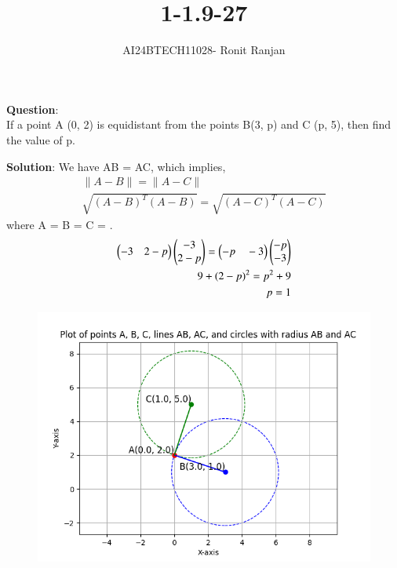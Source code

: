 \documentclass[journal]{IEEEtran}
\begin{document}

\vspace{3cm}

\title{1-1.9-27}
\author{AI24BTECH11028- Ronit Ranjan}

{\let\newpage\relax\maketitle}

\renewcommand{\thefigure}{\theenumi}
\renewcommand{\thetable}{\theenumi}
\setlength{\intextsep}{10pt} %


\renewcommand{\thetable}{\theenumi}

\textbf{Question}:\\
If a point A (0, 2) is equidistant from the points B(3, p) and C (p, 5), then find the value of p.


\textbf{Solution}:
We have AB = AC, which implies,
\begin{align}
    \|A-B\| = \|A-C\| \\
    \sqrt{(A-B)^{T}(A-B)} = \sqrt{(A-C)^{T}(A-C)}
\end{align}
where A = 
B = 
C = .
\begin{align}
    \begin{pmatrix}
    -3\quad 2-p
    \end{pmatrix}
    \begin{pmatrix}
    -3\\
    2-p
    \end{pmatrix} = 
    \begin{pmatrix}
    -p\quad -3
    \end{pmatrix}
    \begin{pmatrix}
    -p\\
    -3
    \end{pmatrix}
    \\
    9 + (2-p)^{2} = p^{2} +9 \\
    p = 1
\end{align}
\begin{figure}[hbt!]
		\centering
		\includegraphics[width=0.8\linewidth]{plots/plot1.png}

	\end{figure}
\end{document}
